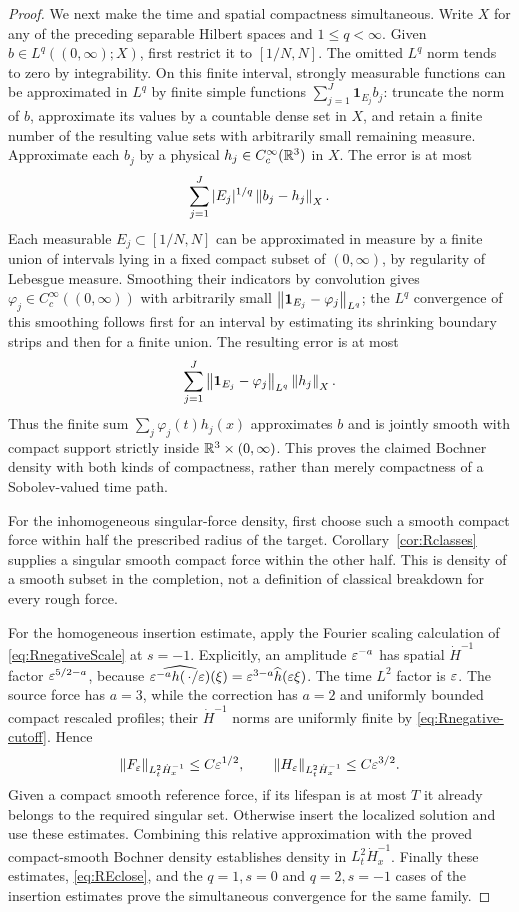 \begin{proof}
We next make the time and spatial compactness simultaneous. Write $X$ for any of the preceding separable Hilbert spaces and $1\le q<\infty$. Given $b\in L^q((0,\infty);X)$, first restrict it to $[1/N,N]$. The omitted $L^q$ norm tends to zero by integrability. On this finite interval, strongly measurable functions can be approximated in $L^q$ by finite simple functions
$\sum_{j=1}^J\mathbf1_{E_j}b_j$: truncate the norm of $b$, approximate its values by a countable dense set in $X$, and retain a finite number of the resulting value sets with arbitrarily small remaining measure. Approximate each $b_j$ by a physical $h_j\in C_c^\infty(\mathbb R^3)$ in $X$. The error is at most
\[
 \sum_{j=1}^J |E_j|^{1/q}\left\lVert b_j-h_j\right\rVert_X.
\]
Each measurable $E_j\subset[1/N,N]$ can be approximated in measure by a finite union of intervals lying in a fixed compact subset of $(0,\infty)$, by regularity of Lebesgue measure. Smoothing their indicators by convolution gives $\varphi_j\in C_c^\infty((0,\infty))$ with arbitrarily small $\left\lVert\mathbf1_{E_j}-\varphi_j\right\rVert_{L^q}$; the $L^q$ convergence of this smoothing follows first for an interval by estimating its shrinking boundary strips and then for a finite union. The resulting error is at most
\[
 \sum_{j=1}^J\left\lVert\mathbf1_{E_j}-\varphi_j\right\rVert_{L^q}\left\lVert h_j\right\rVert_X.
\]
Thus the finite sum $\sum_j\varphi_j(t)h_j(x)$ approximates $b$ and is jointly smooth with compact support strictly inside $\mathbb R^3\times(0,\infty)$. This proves the claimed Bochner density with both kinds of compactness, rather than merely compactness of a Sobolev-valued time path.

For the inhomogeneous singular-force density, first choose such a smooth compact force within half the prescribed radius of the target. Corollary~\ref{cor:Rclasses} supplies a singular smooth compact force within the other half. This is density of a smooth subset in the completion, not a definition of classical breakdown for every rough force.

For the homogeneous insertion estimate, apply the Fourier scaling calculation of \eqref{eq:RnegativeScale} at $s=-1$. Explicitly, an amplitude $\varepsilon^{-a}$ has spatial $\dot H^{-1}$ factor $\varepsilon^{5/2-a}$, because
$\widehat{\varepsilon^{-a}h(\,\cdot/\varepsilon)}(\xi)=\varepsilon^{3-a}\widehat h(\varepsilon\xi)$.
The time $L^2$ factor is $\varepsilon$. The source force has $a=3$, while the correction has $a=2$ and uniformly bounded compact rescaled profiles; their $\dot H^{-1}$ norms are uniformly finite by \eqref{eq:Rnegative-cutoff}. Hence
\[
 \left\lVert F_\varepsilon\right\rVert_{L^2_t\dot H^{-1}_x}\le C\varepsilon^{1/2},\qquad
 \left\lVert H_\varepsilon\right\rVert_{L^2_t\dot H^{-1}_x}\le C\varepsilon^{3/2}.
\]
Given a compact smooth reference force, if its lifespan is at most $T$ it already belongs to the required singular set. Otherwise insert the localized solution and use these estimates. Combining this relative approximation with the proved compact-smooth Bochner density establishes density in $L^2_t\dot H^{-1}_x$. Finally these estimates, \eqref{eq:REclose}, and the $q=1,s=0$ and $q=2,s=-1$ cases of the insertion estimates prove the simultaneous convergence for the same family.
\end{proof}


